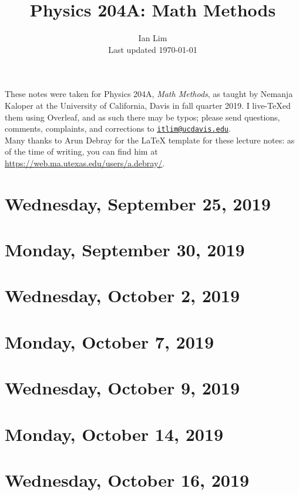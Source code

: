 \documentclass{../mynotes}
\begin{document}
\title{Physics 204A: Math Methods}
\author{Ian Lim\\ Last updated \today}
\maketitle
{\small\noindent These notes were taken for Physics 204A, \emph{Math Methods}, as taught by Nemanja Kaloper at the University of California, Davis in fall quarter 2019. I live-\TeX ed them using Overleaf, and as such there may be typos; please send questions, comments, complaints, and corrections to 
\href{mailto:itlim@ucdavis.edu?subject=204A\%20Lecture\%20Notes}{\texttt{itlim@ucdavis.edu}}.\\
Many thanks to Arun Debray for the {\LaTeX} template for these lecture notes: as of the time of writing, you can find him at \url{https://web.ma.utexas.edu/users/a.debray/}.}

\tableofcontents

\section{Wednesday, September 25, 2019}
	
	

\section{Monday, September 30, 2019}
    
\section{Wednesday, October 2, 2019}
    
    
\section{Monday, October 7, 2019}
	
	
\section{Wednesday, October 9, 2019}
    

\section{Monday, October 14, 2019}
    
\section{Wednesday, October 16, 2019}
    
\end{document}
